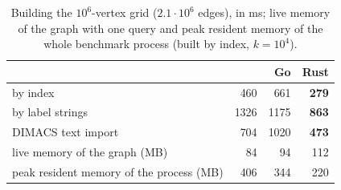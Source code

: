 \begin{table}[t]
\centering
\caption{Building the $10^6$-vertex grid ($2.1\cdot10^6$ edges), in ms; live memory of the graph with one query and peak resident memory of the whole benchmark process (built by index, $k=10^4$).}
\label{tab:build}
\small
\begin{tabular}{lrrr}
\toprule
 & \cs{} & Go & Rust \\
\midrule
by index & \num{460} & \num{661} & \textbf{\num{279}} \\
by label strings & \num{1326} & \num{1175} & \textbf{\num{863}} \\
DIMACS text import & \num{704} & \num{1020} & \textbf{\num{473}} \\
\midrule
live memory of the graph (MB) & 84 & 94 & 112 \\
peak resident memory of the process (MB) & 406 & 344 & 220 \\
\bottomrule
\end{tabular}
\end{table}
